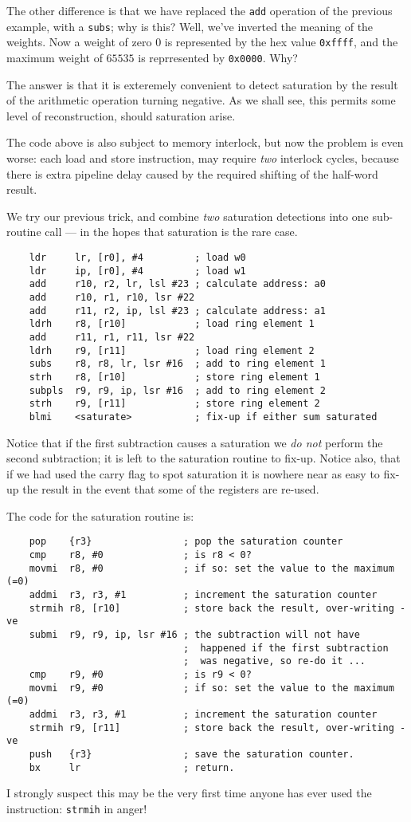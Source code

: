 The other difference is that we have replaced the {\tt add} operation
of the previous example, with a {\tt subs}; why is this? Well, we've
inverted the meaning of the weights. Now a weight of zero $0$ is
represented by the hex value {\tt 0xffff}, and the maximum weight of
$65535$ is reprresented by {\tt 0x0000}. Why?

The answer is that it is exteremely convenient to detect saturation by
the result of the arithmetic operation turning negative. As we shall
see, this permits some level of reconstruction, should saturation
arise.

The code above is also subject to memory interlock, but now the
problem is even worse: each load and store instruction, may require
{\em two} interlock cycles, because there is extra pipeline delay
caused by the required shifting of the half-word result.

We try our previous trick, and combine {\em two} saturation detections
into one sub-routine call --- in the hopes that saturation is the rare
case.
\begin{verbatim}
    ldr     lr, [r0], #4         ; load w0
    ldr     ip, [r0], #4         ; load w1
    add     r10, r2, lr, lsl #23 ; calculate address: a0
    add     r10, r1, r10, lsr #22
    add     r11, r2, ip, lsl #23 ; calculate address: a1
    ldrh    r8, [r10]            ; load ring element 1
    add     r11, r1, r11, lsr #22
    ldrh    r9, [r11]            ; load ring element 2
    subs    r8, r8, lr, lsr #16  ; add to ring element 1
    strh    r8, [r10]            ; store ring element 1
    subpls  r9, r9, ip, lsr #16  ; add to ring element 2
    strh    r9, [r11]            ; store ring element 2
    blmi    <saturate>           ; fix-up if either sum saturated
\end{verbatim}
Notice that if the first subtraction causes a saturation we {\em do
  not} perform the second subtraction; it is left to the saturation
routine to fix-up. Notice also, that if we had used the carry flag to
spot saturation it is nowhere near as easy to fix-up the result in the
event that some of the registers are re-used.

The code for the saturation routine is:
\begin{verbatim}
    pop    {r3}                ; pop the saturation counter
    cmp    r8, #0              ; is r8 < 0?
    movmi  r8, #0              ; if so: set the value to the maximum (=0)
    addmi  r3, r3, #1          ; increment the saturation counter
    strmih r8, [r10]           ; store back the result, over-writing -ve
    submi  r9, r9, ip, lsr #16 ; the subtraction will not have
                               ;  happened if the first subtraction
                               ;  was negative, so re-do it ...
    cmp    r9, #0              ; is r9 < 0?
    movmi  r9, #0              ; if so: set the value to the maximum (=0)
    addmi  r3, r3, #1          ; increment the saturation counter
    strmih r9, [r11]           ; store back the result, over-writing -ve
    push   {r3}                ; save the saturation counter.
    bx     lr                  ; return.
\end{verbatim}
I strongly suspect this may be the very first time anyone has ever
used the instruction:  {\tt strmih} in anger!

